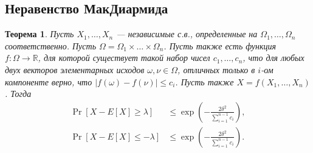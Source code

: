 \documentclass[12pt]{article}
\newcommand\R{\mathbb{R}}
\newtheorem{theorem}{Теорема}
\begin{document}
\subsection{Неравенство МакДиармида}

\begin{theorem}
  Пусть $X_1, \dots, X_n$ --- независимые с.в., определенные на $\Omega_1, \dots, \Omega_n$ соответственно. Пусть $\Omega = \Omega_1 \times \dots \times \Omega_n$. Пусть также есть функция $f: \Omega \to \R$, для которой существует такой набор чисел $c_1, \dots, c_n$, что для любых двух векторов элементарных исходов $\omega, \nu \in \Omega$, отличных только в $i$-ом компоненте верно, что $|f(\omega) - f(\nu)| \le c_i$. Пусть также $X = f(X_1, \dots, X_n)$. Тогда
  \begin{align*}
    \Pr[X - E[X] \ge \lambda] &\le \exp\left(-\frac{2\delta^2}{\sum_{i = 1}^{n - 1}c_i}\right), \\
    \Pr[X - E[X] \le -\lambda] &\le \exp\left(-\frac{2\delta^2}{\sum_{i = 1}^{n - 1}c_i}\right). \\
  \end{align*}
\end{theorem}
\end{document}
